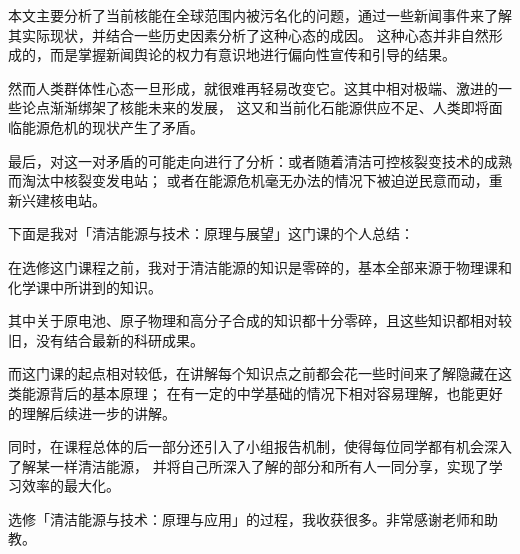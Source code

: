 
\begin{summary}

本文主要分析了当前核能在全球范围内被污名化的问题，通过一些新闻事件来了解其实际现状，并结合一些历史因素分析了这种心态的成因。
这种心态并非自然形成的，而是掌握新闻舆论的权力有意识地进行偏向性宣传和引导的结果。

然而人类群体性心态一旦形成，就很难再轻易改变它。这其中相对极端、激进的一些论点渐渐绑架了核能未来的发展，
这又和当前化石能源供应不足、人类即将面临能源危机的现状产生了矛盾。

最后，对这一对矛盾的可能走向进行了分析：或者随着清洁可控核裂变技术的成熟而淘汰中核裂变发电站；
或者在能源危机毫无办法的情况下被迫逆民意而动，重新兴建核电站。

下面是我对「清洁能源与技术：原理与展望」这门课的个人总结：

在选修这门课程之前，我对于清洁能源的知识是零碎的，基本全部来源于物理课和化学课中所讲到的知识。

其中关于原电池、原子物理和高分子合成的知识都十分零碎，且这些知识都相对较旧，没有结合最新的科研成果。

而这门课的起点相对较低，在讲解每个知识点之前都会花一些时间来了解隐藏在这类能源背后的基本原理；
在有一定的中学基础的情况下相对容易理解，也能更好的理解后续进一步的讲解。

同时，在课程总体的后一部分还引入了小组报告机制，使得每位同学都有机会深入了解某一样清洁能源，
并将自己所深入了解的部分和所有人一同分享，实现了学习效率的最大化。

选修「清洁能源与技术：原理与应用」的过程，我收获很多。非常感谢老师和助教。

\end{summary}
